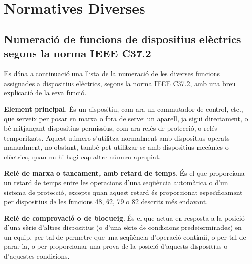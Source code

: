 \chapter{Normatives Diverses}

\section{Numeraci\'{o} de funcions de dispositius el\`{e}ctrics segons la norma \textsf{IEEE C37.2} }\label{sec:ieee-c37-2}

Es d\'{o}na a continuaci\'{o} una llista de la numeraci\'{o} de les diverses funcions assignades a dispositius
el\`{e}ctrics, segons la norma \textsf{IEEE C37.2}, amb una breu
explicaci\'{o} de la seva funci\'{o}.

\begin{multicols}{2}
\begin{list}{}
{\setlength{\labelwidth}{6mm} \setlength{\leftmargin}{6mm}
\setlength{\labelsep}{2mm}}

\item[\textbf{1}]  
\textbf{Element principal}. \'{E}s un dispositiu, com ara un commutador de control, etc., que serveix per posar en marxa o fora de servei un aparell, ja sigui directament, o b\'{e}  mitjan\c{c}ant
dispositius permissius, com ara rel\'{e}s de protecci\'{o}, o rel\'{e}s temporitzats. Aquest n\'{u}mero s'utilitza normalment amb dispositius operats manualment, no obstant, tamb\'{e} pot utilitzar-se amb dispositius mec\`{a}nics o el\`{e}ctrics, quan no hi hagi cap altre n\'{u}mero apropiat.

\item[\textbf{2}]    
  
\textbf{Rel\'{e}
de marxa o tancament, amb retard de temps}. \'{E}s el que
proporciona un retard de temps entre les operacions d'una seq\"{u}\`{e}ncia
autom\`{a}tica o d'un sistema de protecci\'{o}, excepte quan aquest retard
\'{e}s proporcionat espec\'{\i}ficament per dispositius de les funcions 48, 62, 79 o 82
descrits m\'{e}s endavant.

\item[\textbf{3}]  
 \textbf{Rel\'{e} de comprovaci\'{o} o
de bloqueig}. \'{E}s el que actua en resposta a la posici\'{o} d'una s\`{e}rie
d'altres dispositius (o d'una s\`{e}rie de condicions predeterminades)
en un equip, per tal de permetre que una seq\"{u}\`{e}ncia d'operaci\'{o}
continu\"{\i}, o per tal de parar-la, o per proporcionar una prova de la
posici\'{o} d'aquests dispositius o d'aquestes condicions.


\end{list}
\end{multicols}

